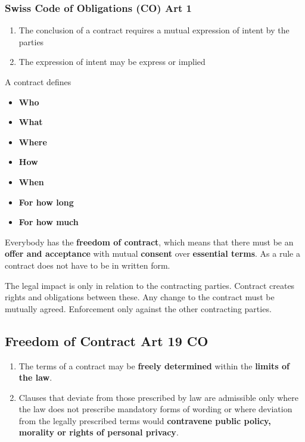 \documentclass[11pt]{article}
\theoremstyle{definition}
\begin{document}
\subsubsection{Swiss Code of Obligations (CO) Art 1}
\begin{enumerate}[label=\arabic* ]
	\item The conclusion of a contract requires a mutual expression of intent by the parties
	\item The expression of intent may be express or implied
\end{enumerate}
\begin{definition}
	A contract defines
	\begin{itemize}[noitemsep,label=]
		\item \textbf{Who}
		\item \textbf{What}
		\item \textbf{Where}
		\item \textbf{How}
		\item \textbf{When}
		\item \textbf{For how long}
		\item \textbf{For how much}
	\end{itemize}
\end{definition}

Everybody has the \textbf{freedom of contract}, which means that there must be an \textbf{offer and acceptance} with mutual \textbf{consent} over \textbf{essential terms}. As a rule a contract does not have to be in written form.

The legal impact is only in relation to the contracting parties. Contract creates rights and obligations between these. Any change to the contract must be mutually agreed. Enforcement only against the other contracting parties.

\subsection{Freedom of Contract Art 19 CO}
\begin{enumerate}[label=\arabic* ]
	\item The terms of a contract may be \textbf{freely determined} within the \textbf{limits of the law}.
	\item Clauses that deviate from those prescribed by law are admissible only where the law does not prescribe mandatory forms of wording or where deviation from the legally prescribed terms would \textbf{contravene public policy, morality or rights of personal privacy}.
\end{enumerate}
\end{document}
